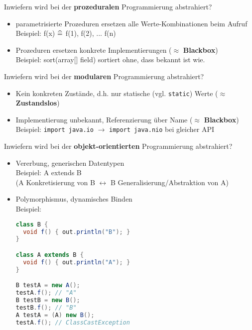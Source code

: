 \begin{card}
	Inwiefern wird bei der \textbf{prozeduralen} Programmierung abstrahiert?
	\hr
	\begin{itemize}
	\item parametrisierte Prozeduren ersetzen alle Werte-Kombinationen beim Aufruf\\
		Beispiel: f(x) $\mathrel{\widehat{=}}$ f(1), f(2), ... f(n)
	\item Prozeduren ersetzen konkrete Implementierungen ($\approx$ \textbf{Blackbox})\\
		Beispiel: sort(array[] field) sortiert ohne, dass bekannt ist wie.
	\end{itemize}
\end{card}

\begin{card}
	Inwiefern wird bei der \textbf{modularen} Programmierung abstrahiert?
	\hr
	\begin{itemize}
	\item Kein konkreten Zustände, d.h. nur statische (vgl. \texttt{static}) Werte ($\approx$ \textbf{Zustandslos})
	\item Implementierung unbekannt, Referenzierung über Name ($\approx$ \textbf{Blackbox})\\
		Beispiel: \texttt{import java.io} $\rightarrow$ \texttt{import java.nio} bei gleicher API
	\end{itemize}
\end{card}

\begin{card}
	Inwiefern wird bei der \textbf{objekt-orientierten} Programmierung abstrahiert?
	\hr
	\begin{itemize}
	\item Vererbung, generischen Datentypen\\
			Beispiel: A extends B\\
			(A Konkretisierung  von B $\leftrightarrow$ B Generalisierung/Abstraktion von A)
	\item Polymorphismus, dynamisches Binden\\
Beispiel:
\begin{lstlisting}[language=Java]
class B {
  void f() { out.println("B"); }
}

class A extends B {
  void f() { out.println("A"); }
}

B testA = new A();
testA.f(); // "A"
B testB = new B();
testB.f(); // "B"
A testA = (A) new B();
testA.f(); // ClassCastException
		\end{lstlisting}
	\end{itemize}
\end{card}

